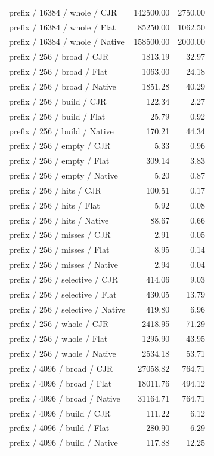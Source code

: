 \begin{longtable}{p{}rr}
prefix / 16384 / whole / CJR & 142500.00 & 2750.00 \\
prefix / 16384 / whole / Flat & 85250.00 & 1062.50 \\
prefix / 16384 / whole / Native & 158500.00 & 2000.00 \\
prefix / 256 / broad / CJR & 1813.19 & 32.97 \\
prefix / 256 / broad / Flat & 1063.00 & 24.18 \\
prefix / 256 / broad / Native & 1851.28 & 40.29 \\
prefix / 256 / build / CJR & 122.34 & 2.27 \\
prefix / 256 / build / Flat & 25.79 & 0.92 \\
prefix / 256 / build / Native & 170.21 & 44.34 \\
prefix / 256 / empty / CJR & 5.33 & 0.96 \\
prefix / 256 / empty / Flat & 309.14 & 3.83 \\
prefix / 256 / empty / Native & 5.20 & 0.87 \\
prefix / 256 / hits / CJR & 100.51 & 0.17 \\
prefix / 256 / hits / Flat & 5.92 & 0.08 \\
prefix / 256 / hits / Native & 88.67 & 0.66 \\
prefix / 256 / misses / CJR & 2.91 & 0.05 \\
prefix / 256 / misses / Flat & 8.95 & 0.14 \\
prefix / 256 / misses / Native & 2.94 & 0.04 \\
prefix / 256 / selective / CJR & 414.06 & 9.03 \\
prefix / 256 / selective / Flat & 430.05 & 13.79 \\
prefix / 256 / selective / Native & 419.80 & 6.96 \\
prefix / 256 / whole / CJR & 2418.95 & 71.29 \\
prefix / 256 / whole / Flat & 1295.90 & 43.95 \\
prefix / 256 / whole / Native & 2534.18 & 53.71 \\
prefix / 4096 / broad / CJR & 27058.82 & 764.71 \\
prefix / 4096 / broad / Flat & 18011.76 & 494.12 \\
prefix / 4096 / broad / Native & 31164.71 & 764.71 \\
prefix / 4096 / build / CJR & 111.22 & 6.12 \\
prefix / 4096 / build / Flat & 280.90 & 6.29 \\
prefix / 4096 / build / Native & 117.88 & 12.25 \\

\end{longtable}
